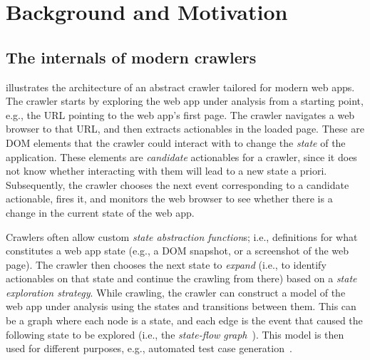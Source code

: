 
\section{Background and Motivation}
\label{sec:motivation}


\subsection{The internals of modern crawlers}
\label{sec:background-crawlers}

 illustrates the architecture of an abstract crawler
tailored for modern web apps.
The crawler starts by exploring the web app under analysis
from a starting point, e.g., the URL pointing to the web app's first page.
The crawler navigates a web browser to that URL,
and then extracts actionables in the loaded page.
These are DOM elements that the crawler could interact with
to change the \textit{state} of the application.
These elements are \textit{candidate} actionables
for a crawler, since it does not know whether interacting with them will 
lead to a new state a priori.
Subsequently, the crawler chooses the next event corresponding to a candidate actionable,
fires it,
and monitors the web browser to see whether there is a change in the current state of the web app.

Crawlers often allow custom \textit{state abstraction function}s; i.e.,
definitions for what constitutes a web app state
(e.g., a DOM snapshot, or a screenshot of the web page).
The crawler then chooses the next state to \textit{expand}
(i.e., to identify actionables on that state and continue the crawling from there)
based on a \textit{state exploration strategy}.
While crawling, the crawler can construct a model of the web app under analysis
using the states and transitions between them.
This can be a graph where each node is a state, 
and each edge is the event that caused the following state to be explored
(i.e., the \textit{state-flow graph}~\cite{Mesbah:2012:Crawljax}).
This model is then used for different purposes,
e.g., automated test case generation~\cite{Mirshokrae:2015:JSFeet}.

